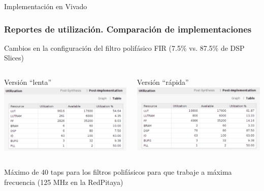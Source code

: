 \documentclass[ignorenonframetext,12pt]{beamer}
\begin{document}
\begin{frame}{Implementación en Vivado}
        \frametitle{Reportes de utilización. Comparación de implementaciones}
				Cambios en la configuración del filtro polifásico FIR (7.5\% vs. 87.5\%
				de DSP Slices)

				\begin{columns}
								\begin{column}{0.5\textwidth}{{\color{blue}Versión ``lenta''}}
												\includegraphics[width=\textwidth]{utilization_table}
								\end{column}
								\begin{column}{0.5\textwidth}{{\color{blue}Versión ``rápida''}}
												\includegraphics[width=\textwidth]{reporte_vivado_fast_rxch16}
								\end{column}
				\end{columns}
				\alert{Máximo de 40 taps para los filtros polifásicos para que trabaje a
				máxima frecuencia (125 MHz en la RedPitaya)}
\end{frame}
\end{document}
